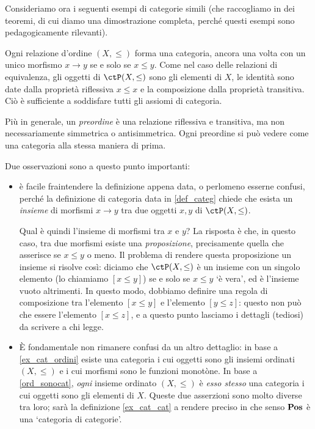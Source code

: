 Consideriamo ora i seguenti esempi di categorie simili (che raccogliamo in dei teoremi, di cui diamo una dimostrazione completa, perché questi esempi sono pedagogicamente rilevanti).
\begin{examples}\label{ord_sonocat}
	Ogni relazione d'ordine \((X,\le)\) forma una categoria, ancora una volta con un unico morfismo \(x\to y\) se e solo se \(x\le y\). Come nel caso delle relazioni di equivalenza, gli oggetti di \(\ctP(X,\le)\) sono gli elementi di \(X\), le identità sono date dalla proprietà riflessiva \(x\le x\) e la composizione dalla proprietà transitiva. Ciò è sufficiente a soddisfare tutti gli assiomi di categoria.

	Più in generale, un \emph{preordine} è una relazione riflessiva e transitiva, ma non necessariamente simmetrica o antisimmetrica. Ogni preordine si può vedere come una categoria alla stessa maniera di prima.
\end{examples}
\begin{remark}
	Due osservazioni sono a questo punto importanti:
	\begin{itemize}
		\item è facile fraintendere la definizione appena data, o perlomeno esserne confusi, perché la definizione di categoria data in \ref{def_categ} chiede che esista un \emph{insieme} di morfismi \(x\to y\) tra due oggetti \(x,y\) di \(\ctP(X,\le)\).

		      Qual è quindi l'insieme di morfismi tra \(x\) e \(y\)? La risposta è che, in questo caso, tra due morfismi esiste una \emph{proposizione}, precisamente quella che asserisce se \(x\le y\) o meno. Il problema di rendere questa proposizione un insieme si risolve così: diciamo che \(\ctP(X,\le)\) è un insieme con un singolo elemento (lo chiamiamo \([x\le y]\)) se e solo se \(x\le y\) `è vera', ed è l'insieme vuoto altrimenti. In questo modo, dobbiamo definire una regola di composizione tra l'elemento \([x\le y]\) e l'elemento \([y\le z]\): questo non può che essere l'elemento \([x\le z]\), e a questo punto lasciamo i dettagli (tediosi) da scrivere a chi legge.
		\item \`E fondamentale non rimanere confusi da un altro dettaglio: in base a \ref{ex_cat_ordini} esiste una categoria i cui oggetti sono gli insiemi ordinati \((X,\le)\) e i cui morfismi sono le funzioni monotòne. In base a \ref{ord_sonocat}, \emph{ogni} insieme ordinato \((X,\le)\) è \emph{esso stesso} una categoria i cui oggetti sono gli elementi di \(X\). Queste due asserzioni sono molto diverse tra loro; sarà la definizione \ref{ex_cat_cat} a rendere preciso in che senso \(\mathbf{Pos}\) è una `categoria di categorie'.
	\end{itemize}
\end{remark}
